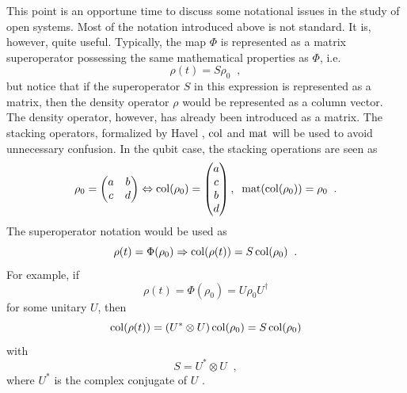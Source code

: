 This point is an opportune time to discuss some notational issues in the study of open systems.  Most of the notation introduced above is not standard.  It is, however, quite useful.  Typically, the map $\Phi$ is represented as a matrix superoperator possessing the same mathematical properties as $\Phi$, i.e.\
$$
\rho(t) = S\rho_0\;\;,
$$
but notice that if the superoperator $S$ in this expression is represented as a matrix, then the density operator $\rho$ would be represented as a column vector.  The density operator, however, has already been introduced as a matrix.  The stacking operators, formalized by Havel \cite{Havel2003}, $\operatorname{col}$ and $\operatorname{mat}$ will be used to avoid unnecessary confusion.  In the qubit case, the stacking operations are seen as
$$
\rho_0 = \begin{pmatrix}
a & b\\
c & d
\end{pmatrix} \Leftrightarrow \operatorname{col}(\rho_0) = \begin{pmatrix}
a\\
c\\
b\\
d
\end{pmatrix},\;\;\operatorname{mat}(\operatorname{col}(\rho_0)) = \rho_0\;\;.
$$
The superoperator notation would be used as
$$
\rho(t) = \Phi(\rho_0) \Rightarrow \operatorname{col}(\rho(t)) = S \operatorname{col}(\rho_0)\;\;.
$$
For example, if
$$
\rho(t) = \Phi(\rho_0) = U\rho_0 U^\dagger
$$
for some unitary $U$, then
$$
\operatorname{col}(\rho(t)) = ( U^* \otimes U)\operatorname{col}(\rho_0) = S \operatorname{col}(\rho_0)
$$
with 
$$
S = U^* \otimes U\;\;,
$$
where $U^*$ is the complex conjugate of $U$ \cite{Havel2003}.

